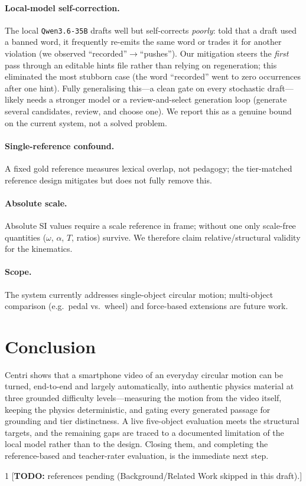 \documentclass[11pt]{article}
\newcommand{\todo}[1]{{\color{red}[\textbf{TODO:} #1]}}
\begin{document}
\paragraph{Local-model self-correction.} The local \texttt{Qwen3.6-35B} drafts
well but self-corrects \emph{poorly}: told that a draft used a banned word, it
frequently re-emits the same word or trades it for another violation (we
observed ``recorded''$\rightarrow$``pushes''). Our mitigation steers the
\emph{first} pass through an editable hints file rather than relying on
regeneration; this eliminated the most stubborn case (the word ``recorded''
went to zero occurrences after one hint). Fully generalising this---a clean
gate on every stochastic draft---likely needs a stronger model or a
review-and-select generation loop (generate several candidates, review, and
choose one). We report this as a genuine bound on the current system, not a
solved problem.

\paragraph{Single-reference confound.} A fixed gold reference measures lexical
overlap, not pedagogy; the tier-matched reference design mitigates but does not
fully remove this.

\paragraph{Absolute scale.} Absolute SI values require a scale reference in
frame; without one only scale-free quantities ($\omega$, $\alpha$, $T$, ratios)
survive. We therefore claim relative/structural validity for the kinematics.

\paragraph{Scope.} The system currently addresses single-object circular
motion; multi-object comparison (e.g.\ pedal vs.\ wheel) and force-based
extensions are future work.

\section{Conclusion}
Centri shows that a smartphone video of an everyday circular motion can be
turned, end-to-end and largely automatically, into authentic physics material
at three grounded difficulty levels---measuring the motion from the video
itself, keeping the physics deterministic, and gating every generated passage
for grounding and tier distinctness. A live five-object evaluation meets the
structural targets, and the remaining gaps are traced to a documented
limitation of the local model rather than to the design. Closing them, and
completing the reference-based and teacher-rater evaluation, is the immediate
next step.


\begin{thebibliography}{1}
 \todo{references pending (Background/Related Work skipped in this draft).}
\end{thebibliography}
\end{document}

